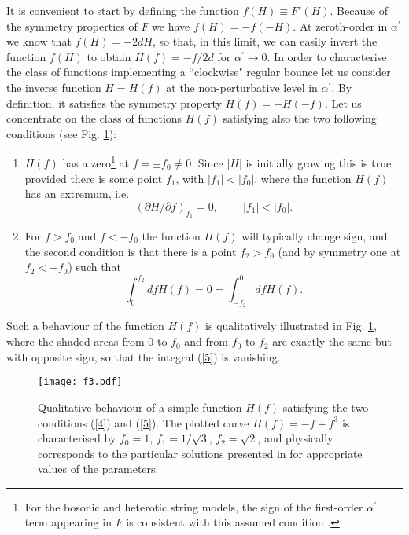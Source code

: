 \documentclass[a4paper,11pt]{article}
\def\beq{\begin{equation}}
\def\eeq{\end{equation}}
\def \pa {\partial}
\def \ra {\rightarrow}
\def \ap {\alpha^{\prime}}
\begin{document}
It is convenient to start by defining the function $f(H)\equiv  F'(H)$.  Because of the symmetry properties of $F$ we have $f(H)=- f(-H)$. At zeroth-order in $\ap$ we know that $f(H)= -2 d H$, so that, in this limit, we can easily invert the function $f(H)$ to obtain $H(f)= -f/2d$ for $\ap \ra 0$. 
In order to characterise the class of functions implementing a  ``clockwise" regular bounce let us consider the inverse function $H= H(f)$ at the non-perturbative level in $\ap$. By definition, it satisfies the symmetry property $H(f)=-H(-f)$. 
Let us concentrate on the class of functions $H(f)$ satisfying also the two following conditions (see Fig. \ref{f3}):
\begin{enumerate}
\item{}
 $H(f)$ has a zero\footnote{For the bosonic and heterotic string models, the sign of the first-order $\ap$ term appearing in $F$ is consistent with this assumed condition  \cite{1}.}
 at $f= \pm f_0 \not=0$. Since $|H|$ is initially growing this is true provided there is some point $f_1$, with $|f_1| <|f_0|$, where the function $H(f)$ has an extremum, i.e.
 \beq 
 \left(\pa H/\pa f\right)_{f_1} =0, ~~~~~~~~~~ |f_1| <|f_0|.
 \label{4}
 \eeq
 \item{}
For $f>f_0$ and $f<-f_0$ the function $H(f)$ will typically change sign, and the second condition is that there is a point $f_2>f_0$ (and by symmetry one at $f_2 < - f_0$) such that
\beq
\int_0^{f_2} dfH(f) = 0 =  \int_{-f_2}^0 df H(f) .
\label{5}
\eeq
\end{enumerate}
Such a behaviour of the function $H(f)$ is qualitatively illustrated in Fig. \ref{f3}, where the shaded areas from $0$ to $f_0$ and from $f_0$ to $f_2$ are exactly the same but with opposite sign, so that the integral (\ref{5}) is vanishing. 

\begin{figure}[t]
\centering
\texttt{[image: f3.pdf]}
\caption{Qualitative behaviour of a simple function $H(f)$ satisfying the two conditions (\ref{4}) and (\ref{5}). The plotted curve $H(f)= -f+f^3$ is   characterised by  $f_0=1$, $f_1=1/\sqrt{3}$, $f_2= \sqrt{2}$, and physically corresponds to the particular solutions presented in \cite{2} for appropriate values of the parameters.}
\label{f3}
\end{figure}
\end{document}
